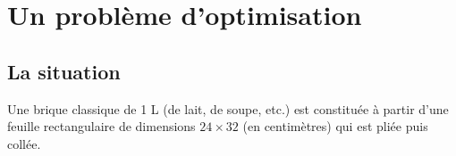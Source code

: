 



\fancyhead{} %

\fancyhead{} %





\chapter{Un probl\`eme d'optimisation}


 \setcounter{page}{1}

\section{La situation}

Une brique classique de 1 L (de lait, de soupe, etc.) est constitu\'ee \`a partir d'une feuille rectangulaire de dimensions $24\times 32$ (en centim\`etres) qui est pli\'ee puis coll\'ee.

